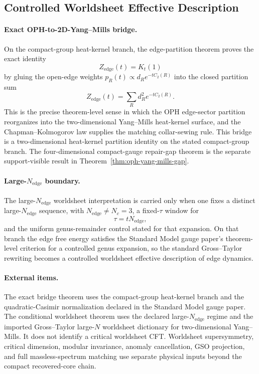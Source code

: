 \subsection{Controlled Worldsheet Effective Description}

\paragraph{Exact OPH-to-2D-Yang--Mills bridge.}
On the compact-group heat-kernel branch, the edge-partition theorem proves the exact identity
\[
Z_{\mathrm{edge}}(t)=K_t(1)
\]
by gluing the open-edge weights \(p_R(t)\propto d_R e^{-tC_2(R)}\) into the closed partition sum
\[
Z_{\mathrm{edge}}(t)=\sum_R d_R^2 e^{-tC_2(R)}.
\]
This is the precise theorem-level sense in which the OPH edge-sector partition reorganizes into
the two-dimensional Yang--Mills heat-kernel surface, and the Chapman--Kolmogorov law supplies the
matching collar-sewing rule.
This bridge is a two-dimensional heat-kernel partition identity on the stated compact-group
branch. The four-dimensional compact-gauge repair-gap theorem is the separate support-visible
result in Theorem~\ref{thm:oph-yang-mills-gap}.

\paragraph{Large-\(N_{\mathrm{edge}}\) boundary.}
The large-\(N_{\mathrm{edge}}\)
worldsheet interpretation is carried only when one fixes a distinct large-\(N_{\mathrm{edge}}\)
sequence, with \(N_{\mathrm{edge}}\neq N_c=3\), a fixed-\(\tau\) window for
\[
\tau=tN_{\mathrm{edge}},
\]
and the uniform genus-remainder control stated for that expansion. On that branch the
edge free energy satisfies the Standard Model gauge paper's theorem-level criterion for a controlled genus
expansion, so the standard Gross--Taylor rewriting becomes a controlled worldsheet effective
description of edge dynamics.

\paragraph{External items.}
The exact bridge theorem uses the compact-group heat-kernel branch and the quadratic-Casimir
normalization declared in the Standard Model gauge paper. The conditional worldsheet theorem uses the declared
large-\(N_{\mathrm{edge}}\) regime and the imported Gross--Taylor large-\(N\) worldsheet dictionary
for two-dimensional Yang--Mills. It does not identify a critical worldsheet CFT. Worldsheet
supersymmetry, critical dimension, modular invariance, anomaly cancellation, GSO projection, and
full massless-spectrum matching use separate physical inputs beyond the compact recovered-core
chain.

